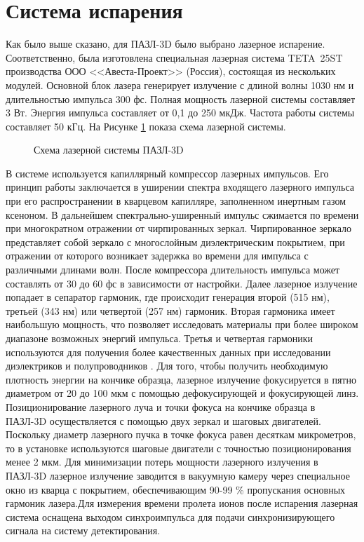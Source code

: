\section{Система испарения}\label{sec:ch2/sec3}

Как было выше сказано, для ПАЗЛ-3D было выбрано лазерное испарение. Соответственно, была изготовлена специальная лазерная система TETA~25ST производства ООО <<Авеста-Проект>> (Россия), состоящая из нескольких модулей. Основной блок лазера генерирует излучение с длиной волны 1030 нм и длительностью импульса 300 фс. Полная мощность лазерной системы составляет 3 Вт. Энергия импульса составляет от 0,1 до 250 мкДж. Частота работы системы составляет 50 кГц. На Рисунке \cref{fig:APPLE_lasersystem} показа схема лазерной системы.

\begin{figure}[htb]
	\caption{Схема лазерной системы ПАЗЛ-3D}
	\label{fig:APPLE_lasersystem}
\end{figure}

В системе используется капиллярный компрессор лазерных импульсов. Его принцип работы заключается в уширении спектра входящего лазерного импульса при его распространении в кварцевом капилляре, заполненном инертным газом ксеноном. В дальнейшем спектрально-уширенный импульс сжимается по времени при многократном отражении от чирпированных зеркал. Чирпированное зеркало представляет собой зеркало с многослойным диэлектрическим покрытием, при отражении от которого возникает задержка во времени для импульса с различными длинами волн. После компрессора длительность импульса может составлять от 30 до 60 фс в зависимости от настройки. Далее лазерное излучение попадает в сепаратор гармоник, где происходит генерация второй (515 нм), третьей (343 нм) или четвертой (257 нм) гармоник. Вторая гармоника имеет наибольшую мощность, что позволяет исследовать материалы при более широком диапазоне возможных энергий импульса. Третья и четвертая гармоники используются для получения более качественных данных при исследовании диэлектриков и полупроводников \cite{Gault06}. Для того, чтобы получить необходимую плотность энергии на кончике образца, лазерное излучение фокусируется в пятно диаметром от 20 до 100 мкм с помощью дефокусирующей и фокусирующей линз. Позиционирование лазерного луча и точки фокуса на кончике образца в ПАЗЛ-3D осуществляется с помощью двух зеркал и шаговых двигателей. Поскольку диаметр лазерного пучка в точке фокуса равен десяткам микрометров, то в установке используются шаговые двигатели с точностью позиционирования менее 2 мкм. Для минимизации потерь мощности лазерного излучения в ПАЗЛ-3D лазерное излучение заводится в вакуумную камеру через специальное окно из кварца с покрытием, обеспечивающим 90-99 \% пропускания основных гармоник лазера.Для измерения времени пролета ионов после испарения лазерная система оснащена выходом синхроимпульса для подачи синхронизирующего сигнала на систему детектирования.

